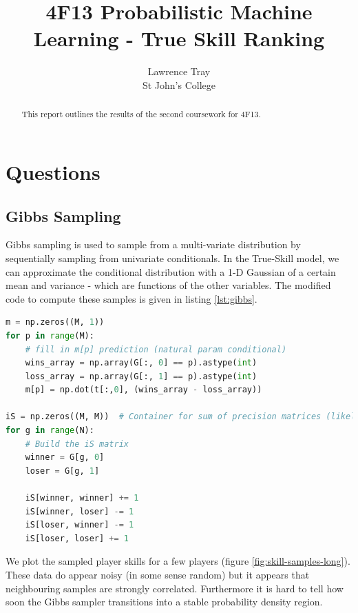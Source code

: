\documentclass[]{article}
\title{4F13 Probabilistic Machine Learning - True Skill Ranking}
\author{Lawrence Tray \\ St John's College}
\begin{document}


\setcounter{page}{1}
\maketitle

\begin{abstract}
This report outlines the results of the second coursework for 4F13. 
\end{abstract}

\tableofcontents

\section{Questions}
\subsection{Gibbs Sampling}

Gibbs sampling is used to sample from a multi-variate distribution by sequentially sampling from univariate conditionals. In the True-Skill model, we can approximate the conditional distribution with a 1-D Gaussian of a certain mean and variance - which are functions of the other variables. The modified code to compute these samples is given in listing \ref{lst:gibbs}.

\begin{lstlisting}[frame=single, caption={Gibbs sampling additions}, label={lst:gibbs}, language={python}]
m = np.zeros((M, 1))
for p in range(M):
	# fill in m[p] prediction (natural param conditional)
	wins_array = np.array(G[:, 0] == p).astype(int)
	loss_array = np.array(G[:, 1] == p).astype(int)
	m[p] = np.dot(t[:,0], (wins_array - loss_array))
	
iS = np.zeros((M, M))  # Container for sum of precision matrices (likelihood terms)
for g in range(N):
	# Build the iS matrix
	winner = G[g, 0]
	loser = G[g, 1]
	
	iS[winner, winner] += 1
	iS[winner, loser] -= 1
	iS[loser, winner] -= 1
	iS[loser, loser] += 1
\end{lstlisting}

We plot the sampled player skills for a few players (figure \ref{fig:skill-samples-long}). These data do appear noisy (in some sense random) but it appears that neighbouring samples are strongly correlated. Furthermore it is hard to tell how soon the Gibbs sampler transitions into a stable probability density region.
\end{document}
